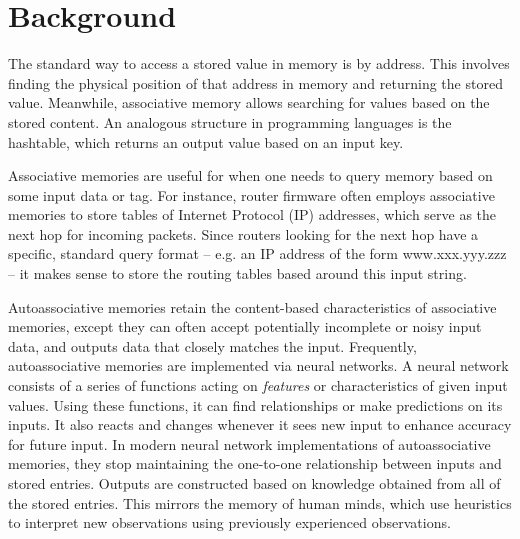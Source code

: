 \documentclass{sig-alternate}
\begin{document}
\section{Background}
\label{sec:background}

The standard way to access a stored value in memory is by address. 
This involves finding the physical position of that address in memory
and returning the stored value. Meanwhile, associative memory allows
searching for values based on the stored content. An analogous structure
in programming languages is the hashtable, which returns an output value
based on an input key.

Associative memories are useful for when one needs to query memory based 
on some input data or tag. For instance, router firmware often employs associative 
memories to store tables of Internet Protocol (IP) addresses, which serve as the next hop for incoming 
packets. Since routers looking for the next hop have a specific, standard query 
format -- e.g. an IP address of the form www.xxx.yyy.zzz -- it makes sense to store the 
routing tables based around this input string.

Autoassociative memories retain the content-based characteristics of associative memories, except they can often 
accept potentially incomplete or noisy input data, and outputs data that closely matches the input.
Frequently, autoassociative memories are implemented via neural networks. 
A neural network consists of a series of functions acting on \textit{features} or characteristics of given input values. 
Using these functions, it can find relationships or make predictions on its inputs. It also
reacts and changes whenever it sees new input to enhance accuracy for future input.
In modern neural network implementations of autoassociative memories, they stop maintaining the one-to-one relationship between inputs and 
stored entries. Outputs are constructed based on knowledge obtained from all of the stored entries.
This mirrors the memory of human minds, which use heuristics to interpret new observations using
previously experienced observations. 
\end{document}
